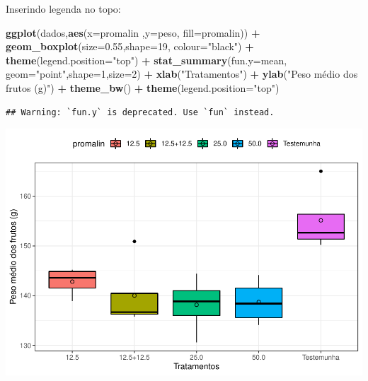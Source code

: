 \documentclass[
]{book}
\newenvironment{Shaded}{\begin{snugshade}}{\end{snugshade}}
\newcommand{\DataTypeTok}[1]{\textcolor[rgb]{0.13,0.29,0.53}{#1}}
\newcommand{\DecValTok}[1]{\textcolor[rgb]{0.00,0.00,0.81}{#1}}
\newcommand{\FloatTok}[1]{\textcolor[rgb]{0.00,0.00,0.81}{#1}}
\newcommand{\KeywordTok}[1]{\textcolor[rgb]{0.13,0.29,0.53}{\textbf{#1}}}
\newcommand{\NormalTok}[1]{#1}
\newcommand{\OperatorTok}[1]{\textcolor[rgb]{0.81,0.36,0.00}{\textbf{#1}}}
\newcommand{\StringTok}[1]{\textcolor[rgb]{0.31,0.60,0.02}{#1}}
\begin{document}
Inserindo legenda no topo:

\begin{Shaded}
\begin{Highlighting}[]
\KeywordTok{ggplot}\NormalTok{(dados,}\KeywordTok{aes}\NormalTok{(}\DataTypeTok{x=}\NormalTok{promalin ,}\DataTypeTok{y=}\NormalTok{peso, }\DataTypeTok{fill=}\NormalTok{promalin)) }\OperatorTok{+}\StringTok{ }
\StringTok{      }\KeywordTok{geom_boxplot}\NormalTok{(}\DataTypeTok{size=}\FloatTok{0.55}\NormalTok{,}\DataTypeTok{shape=}\DecValTok{19}\NormalTok{, }\DataTypeTok{colour=}\StringTok{"black"}\NormalTok{) }\OperatorTok{+}\StringTok{ }
\StringTok{      }\KeywordTok{theme}\NormalTok{(}\DataTypeTok{legend.position=}\StringTok{"top"}\NormalTok{) }\OperatorTok{+}\StringTok{ }
\StringTok{      }\KeywordTok{stat_summary}\NormalTok{(}\DataTypeTok{fun.y=}\NormalTok{mean, }\DataTypeTok{geom=}\StringTok{"point"}\NormalTok{,}\DataTypeTok{shape=}\DecValTok{1}\NormalTok{,}\DataTypeTok{size=}\DecValTok{2}\NormalTok{) }\OperatorTok{+}\StringTok{ }
\StringTok{      }\KeywordTok{xlab}\NormalTok{(}\StringTok{"Tratamentos"}\NormalTok{) }\OperatorTok{+}\StringTok{  }
\StringTok{      }\KeywordTok{ylab}\NormalTok{(}\StringTok{"Peso médio dos frutos (g)"}\NormalTok{)  }\OperatorTok{+}
\StringTok{      }\KeywordTok{theme_bw}\NormalTok{() }\OperatorTok{+}
\StringTok{      }\KeywordTok{theme}\NormalTok{(}\DataTypeTok{legend.position=}\StringTok{"top"}\NormalTok{) }
\end{Highlighting}
\end{Shaded}

\begin{verbatim}
## Warning: `fun.y` is deprecated. Use `fun` instead.
\end{verbatim}

\includegraphics{TudodoR_files/figure-latex/unnamed-chunk-238-1.pdf}
\end{document}
